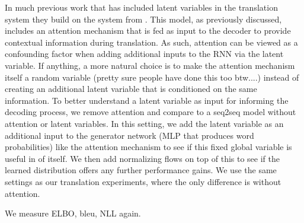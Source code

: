 In much previous work that has included latent variables in the translation system they build on the system from \cite{bahndanau et. al.} . This model, as previously discussed, includes an attention mechanism that is fed as input to the decoder to provide contextual information during translation. As such, attention can be viewed as a confounding factor when adding additional inputs to the RNN via the latent variable. If anything, a more natural choice is to make the attention mechanism itself a random variable (pretty sure people have done this too btw....) instead of creating an additional latent variable that is conditioned on the same information. To better understand a latent variable as input for informing the decoding process, we remove attention and compare to a seq2seq model without attention or latent variables. In this setting, we add the latent variable as an additional input to the generator network (MLP that produces word probabilities) like the attention mechanism to see if this fixed global variable is useful in of itself. We then add normalizing flows on top of this to see if the learned distribution offers any further performance gains. We use the same settings as our translation experiments, where the only difference is without attention.

We measure ELBO, bleu, NLL again.

